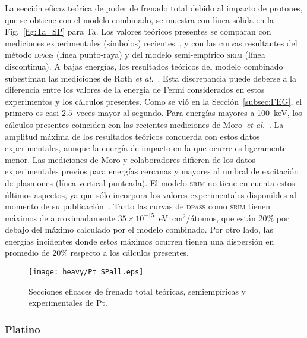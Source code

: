 La sección eficaz teórica de poder de frenado total debido al 
impacto de protones, que se obtiene con el modelo combinado, 
se muestra con línea sólida en la Fig.~\ref{fig:Ta_SP} para Ta. Los 
valores teóricos presentes se comparan con mediciones experimentales 
(símbolos) recientes~\cite{Moro:20,Roth:17,iaea,Shiomi:96,Shiomi:94,
Bichsel:92,Ogino:88,Sirotinin:84,Krist:83}, y con las curvas resultantes 
del método \textsc{dpass} (línea punto-raya) y del modelo semi-empírico 
\textsc{srim} (línea discontinua). A bajas energías, los resultados 
teóricos del modelo combinado subestiman las mediciones de Roth 
\textit{et al.}~\cite{Roth:17}. Esta discrepancia puede deberse a la 
diferencia entre los valores de la energía de Fermi considerados en 
estos experimentos y los cálculos presentes. Como se vió en la 
Sección~\ref{subsec:FEG}, el primero es casi $2.5$~veces mayor al 
segundo. Para energías mayores a 100~keV, los cálculos presentes 
coinciden con las recientes mediciones de 
Moro~\textit{et al.}~\cite{Moro:20}. La amplitud máxima de los 
resultados teóricos concuerda con estos datos experimentales, aunque la 
energía de impacto en la que ocurre es ligeramente menor. Las mediciones 
de Moro y colaboradores difieren de los datos experimentales previos 
para energías cercanas y mayores al umbral de excitación de plasmones 
(línea vertical punteada). El modelo \textsc{srim} no tiene en cuenta 
estos últimos aspectos, ya que sólo incorpora los valores experimentales 
disponibles al momento de su publicación~\cite{iaea}. Tanto las curvas 
de \textsc{dpass} como \textsc{srim} tienen máximos de aproximadamente 
$35\times 10^{-15}$~eV~cm$^2$/átomos, que están 20\% por debajo del 
máximo calculado por el modelo combinado. Por otro lado, las energías 
incidentes donde estos máximos ocurren tienen una dispersión en promedio 
de 20\% respecto a los cálculos presentes. 

\begin{figure}[t]
\centering
\texttt{[image: heavy/Pt\_SPall.eps]}
\caption[Secciones eficaces teóricas, semiempíricas y experimentales de 
Pt.]
{Secciones eficaces de frenado total teóricas, semiempíricas y
experimentales de Pt.}
\label{fig:Pt_SP}
\end{figure}

\subsubsection{Platino}

